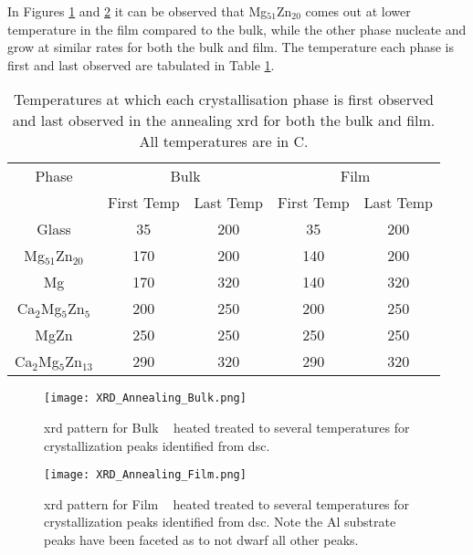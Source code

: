 \documentclass[a4paper,12pt,oneside]{article}%
\begin{document}
In Figures \ref{fig:XRD_Annealing_Bulk} and \ref{fig:XRD_Annealing_Film} it can be observed that Mg$_{51}$Zn$_{20}$ comes out at lower temperature in the film compared to the bulk, while the other phase nucleate and grow at similar rates for both the bulk and film. The temperature each phase is first and last observed are tabulated in Table \ref{tab:Crystal_Sequence}. 

\begin{table}[h]
	\centering
	\begin{tabular}{ c c c c c }
		\toprule
		Phase & \multicolumn{2}{c}{Bulk} & \multicolumn{2}{c}{Film}                 \\
		& First Temp & Last Temp & First Temp & Last Temp \\
		\midrule
		Glass 						& 35 & 200 & 35 & 200 \\
		Mg$_{51}$Zn$_{20}$ \cite{Zhang2013, Khan1989} & 170 & 200 & 140 & 200 \\
		Mg 							& 170 & 320 & 140 & 320 \\
		Ca$_{2}$Mg$_{5}$Zn$_{5}$ \cite{Zhang2013, Cao2016} & 200 & 250 & 200 & 250 \\
		MgZn \cite{Khan1989} & 250 & 250 & 250 & 250 \\
		Ca$_{2}$Mg$_{5}$Zn$_{13}$ \cite{Zhang2013, Zhang2012, Zhang2011} & 290 & 320 & 290 & 320 \\
		\bottomrule
	\end{tabular}
	\caption{Temperatures at which each crystallisation phase is first observed and last observed in the annealing \acrshort{xrd} for both the bulk and film. All temperatures are in \degree C.}
	\label{tab:Crystal_Sequence}
\end{table}

\begin{figure}[b]
	\centering
	\texttt{[image: XRD\_Annealing\_Bulk.png]}
	\caption[Table of contents Capition]{\acrshort{xrd} pattern for Bulk \MgZnCa~ heated treated to several temperatures for crystallization peaks identified from \acrshort{dsc}.}
	\label{fig:XRD_Annealing_Bulk}
\end{figure}

\begin{figure}[b]
	\centering
	\texttt{[image: XRD\_Annealing\_Film.png]}
	\caption[Table of contents Capition]{\acrshort{xrd} pattern for Film \MgZnCa~ heated treated to several temperatures for crystallization peaks identified from \acrshort{dsc}. Note the Al substrate peaks have been faceted as to not dwarf all other peaks.}
	\label{fig:XRD_Annealing_Film}
\end{figure}
\end{document}
